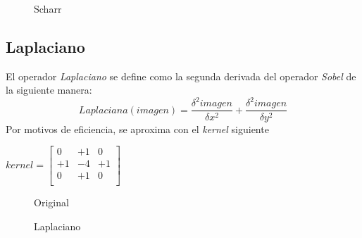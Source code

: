 \begin{figure}[H]
  \centering \setlength\fboxsep{0pt} \setlength\fboxrule{0.5pt}
  \caption{Scharr}
\end{figure}

\subsection{Laplaciano}
El operador \emph{Laplaciano} se define como la segunda derivada del
operador \emph{Sobel} de la siguiente manera:
\begin{equation*}
  Laplaciana(imagen) = \frac{\delta^{2} imagen}{\delta x^{2}} + \frac{\delta^{2} imagen}{\delta y^{2}}
\end{equation*}
Por motivos de eficiencia, se aproxima con el \emph{kernel} siguiente
\begin{center}
  $ kernel = \begin{bmatrix}
    0 & +1 & 0 \\
    +1 & -4 & +1 \\
    0 & +1 & 0 \\
  \end{bmatrix}
  $
\end{center}

\begin{figure}[H]
  \caption{Original}
  \centering \setlength\fboxsep{0pt} \setlength\fboxrule{0.5pt}
\end{figure}

\begin{figure}[H]
  \centering \setlength\fboxsep{0pt} \setlength\fboxrule{0.5pt}
  \caption{Laplaciano}
\end{figure}

